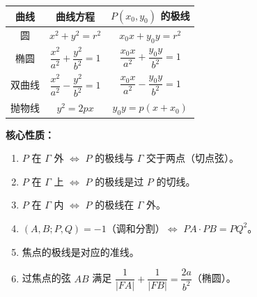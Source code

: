 \documentclass[12pt,a4paper]{ctexart}
\theoremstyle{definition}
\begin{document}
\begin{knowledgebox}[极点极线核心公式速查表]
\renewcommand{\arraystretch}{1.4}
\begin{center}
\begin{tabular}{|c|c|c|}
\hline
\textbf{曲线} & \textbf{曲线方程} & \textbf{$P(x_0,y_0)$ 的极线} \\
\hline
圆 & $x^2+y^2=r^2$ & $x_0 x+y_0 y=r^2$ \\
\hline
椭圆 & $\dfrac{x^2}{a^2}+\dfrac{y^2}{b^2}=1$ & $\dfrac{x_0 x}{a^2}+\dfrac{y_0 y}{b^2}=1$ \\
\hline
双曲线 & $\dfrac{x^2}{a^2}-\dfrac{y^2}{b^2}=1$ & $\dfrac{x_0 x}{a^2}-\dfrac{y_0 y}{b^2}=1$ \\
\hline
抛物线 & $y^2=2px$ & $y_0 y=p(x+x_0)$ \\
\hline
\end{tabular}
\end{center}

\vspace{6pt}
\textbf{核心性质：}
\begin{enumerate}[label=(\arabic*),leftmargin=2em]
  \item $P$ 在 $\Gamma$ 外 $\Longleftrightarrow$ $P$ 的极线与 $\Gamma$ 交于两点（切点弦）。
  \item $P$ 在 $\Gamma$ 上 $\Longleftrightarrow$ $P$ 的极线是过 $P$ 的切线。
  \item $P$ 在 $\Gamma$ 内 $\Longleftrightarrow$ $P$ 的极线在 $\Gamma$ 外。
  \item $(A,B;P,Q)=-1$（调和分割）$\Longleftrightarrow$ $PA\cdot PB=PQ^2$。
  \item 焦点的极线是对应的准线。
  \item 过焦点的弦 $AB$ 满足 $\dfrac{1}{|FA|}+\dfrac{1}{|FB|}=\dfrac{2a}{b^2}$（椭圆）。
\end{enumerate}
\end{knowledgebox}
\end{document}
